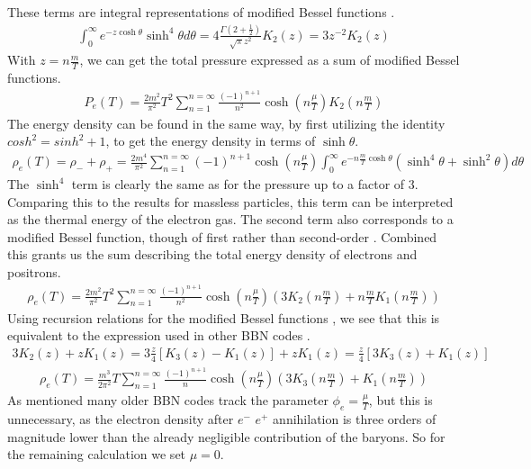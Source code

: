 These terms are integral representations of modified Bessel functions \cite[\href{https://dlmf.nist.gov/10.32.E8}{(10.32.8)}]{NIST:DLMF}.
\begin{align}
    \int_{0}^{\infty}e^{-z\cosh\theta}\sinh^4 \theta d\theta=4\frac{\Gamma(2+\frac{1}{2})}{\sqrt{\pi}z^2}K_2\left(z\right)=3z^{-2}K_2\left(z\right)
\end{align}
With $z=n\frac{m }{T}$, we can get the total pressure expressed as a sum of modified Bessel functions.
\begin{align}
    P_e(T)=\frac{2m^2}{\pi^2} T^2 \sum_{n=1}^{n=\infty} \frac{(-1)^{n+1}}{n^{2}} \cosh{\left(n\frac{\mu}{T}\right)}   K_2\left(n\frac{m }{T}\right)
    \label{eq:Pelectron}
\end{align}
The energy density can be found in the same way, by first utilizing the identity $cosh^2=sinh^2+1$, to get the energy density in terms of $\sinh\theta$.
\begin{align}
    \rho_e(T)=\rho_-+\rho_+=\frac{2m^4}{\pi^2}\sum_{n=1}^{n=\infty} (-1)^{n+1} \cosh{\left(n\frac{\mu}{T}\right)}  \int_{0}^{\infty}e^{-n\frac{m }{T}\cosh\theta}\left(\sinh^4\theta +\sinh^2\theta\right) d\theta
\end{align}
The $\sinh^4$ term is clearly the same as for the pressure up to a factor of 3. Comparing this to the results for massless particles, this term can be interpreted as the thermal energy of the electron gas. The second term also corresponds to a modified Bessel function, though of first rather than second-order \cite[\href{https://dlmf.nist.gov/10.32.E8}{(10.32.8)}]{NIST:DLMF}. Combined this grants us the sum describing the total energy density of electrons and positrons.
\begin{align}
    \rho_e(T)=\frac{2m^2}{\pi^2} T^2 \sum_{n=1}^{n=\infty} \frac{(-1)^{n+1}}{n^{2}} \cosh{\left(n\frac{\mu}{T}\right)}  \left( 3 K_2\left(n\frac{m }{T}\right) + n\frac{m }{T} K_1\left(n\frac{m }{T}\right) \right)
    \label{eq:rhoelectron}
\end{align}
Using recursion relations for the modified Bessel functions \cite[\href{https://dlmf.nist.gov/10.29.E1}{(10.29.1)}]{NIST:DLMF}, we see that this is equivalent to the expression used in other BBN codes \cite{Kawano}.
\begin{align}
3K_{2}(z)+z K_{1}(z)=3\frac{z}{4}[K_{3}(z)-K_{1}(z)]+z K_{1}(z)=\frac{z}{4}[3K_{3}(z)+K_{1}(z)]
\end{align}
\begin{align}
    \rho_e(T)=\frac{m^3}{2\pi^2} T \sum_{n=1}^{n=\infty} \frac{(-1)^{n+1}}{n} \cosh{\left(n\frac{\mu}{T}\right)}  \left( 3 K_3\left(n\frac{m }{T}\right) + K_1\left(n\frac{m }{T}\right) \right)
\end{align}
As mentioned many older BBN codes track the parameter $\phi_e=\frac{\mu}{T}$, but this is unnecessary, as the electron density after $e^-$ $e^+$ annihilation is three orders of magnitude lower than the already negligible contribution of the baryons. So for the remaining calculation we set $\mu = 0$.

